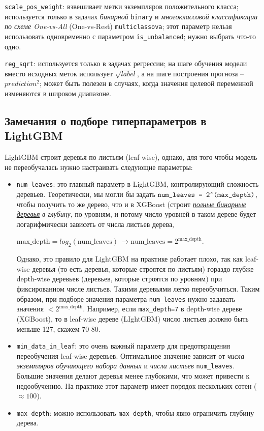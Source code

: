 \documentclass[%
	11pt,
	a4paper,
	utf8,
		]{article}
\begin{document}
\verb|scale_pos_weight|: взвешивает метки экземпляров положительного класса; используется только в задачах \emph{бинарной} \verb|binary| и \emph{многоклассовой классификации по схеме One-vs-All} (One-vs-Rest) \verb|multiclassova|;  этот параметр нельзя использовать одновременно с параметром \verb|is_unbalanced|; нужно выбрать что-то одно.

\verb|reg_sqrt|: используется только в задачах регрессии; на шаге обучения модели вместо исходных меток использует $ \sqrt{label} $, а на шаге построения прогноза -- $ prediction^2 $; может быть полезен в случаях, когда значения целевой переменной изменяются в широком диапазоне.

\subsection{Замечания о подборе гиперпараметров в LightGBM}

LightGBM строит деревья по листьям (leaf-wise), однако, для того чтобы модель не переобучалась нужно настраивать следующие параметры:
\begin{itemize}
	\item \verb|num_leaves|: это главный параметр в LightGBM, контролирующий сложность деревьев. Теоретически, мы могли бы задать $ \verb|num_leaves = 2^(max_depth)| $, чтобы получить то же дерево, что и в XGBoost (строит \underline{\itshape полные бинарные деревья} \emph{в глубину}, по уровням, и потому число уровней в таком дереве будет логарифмически зависеть от числа листьев дерева,
	
	$ \text{max\_depth} = log_2(\text{num\_leaves}) \, \rightarrow \text{num\_leaves} = 2^{\text{max\_depth}}$.
	
	Однако, это правило для LightGBM на практике работает плохо, так как leaf-wise деревья (то есть деревья, которые строятся по листьям) гораздо глубже depth-wise деревьев (деревьев, которые строятся по уровням) при фиксированном числе листьев. Такими деревьями легко переобучиться. {\color{blue}Таким образом, при подборе значения параметра \verb|num_leaves| нужно задавать значения $ < 2^{\text{max\_depth}} $}. Например, если \verb|max_depth=7| в depth-wise дереве (XGBoost), то в leaf-wise дереве (LIghtGBM) число листьев должно быть меньше 127, скажем 70-80.
	
	\item \verb|min_data_in_leaf|: это очень важный параметр для предотвращения переобучения leaf-wise деревьев. Оптимальное значение зависит от \emph{числа экземпляров обучающего набора данных} и \emph{числа листьев} \verb|num_leaves|. Большие значения делают деревья менее глубокими, что может привести к недообучению. На практике этот параметр имеет порядок нескольких сотен ($ \approx 100 $).
	
	\item \verb|max_depth|: можно использовать \verb|max_depth|, чтобы явно ограничить глубину дерева.
\end{itemize}
\end{document}
